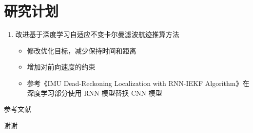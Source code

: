 \documentclass{beamer} %
\begin{document}
\section{研究计划}

\begin{frame}[allowframebreaks]
    \begin{enumerate}
        \item 改进基于深度学习自适应不变卡尔曼滤波航迹推算方法
        \begin{itemize}
            \item 修改优化目标，减少保持时间和距离
            \item 增加对前向速度的约束
            \item 参考《IMU Dead-Reckoning Localization with RNN-IEKF Algorithm》在深度学习部分使用 RNN 模型替换 CNN 模型
        \end{itemize}
    \end{enumerate}
\end{frame}


\begin{frame}[allowframebreaks]{参考文献} %
	\printbibliography[heading=references]
\end{frame}


\begin{frame}
    \begin{center}
        {\Huge 谢谢}
    \end{center}
\end{frame}
\end{document}
